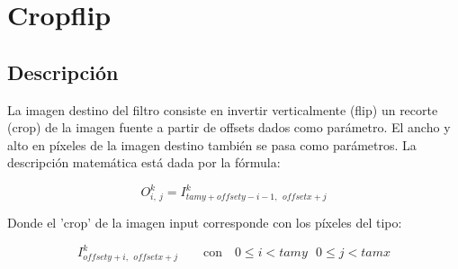 \section{Cropflip}

\subsection{Descripción}
La imagen destino del filtro consiste en invertir verticalmente (flip) un recorte (crop) de la imagen fuente a partir de offsets dados como parámetro. El ancho y alto en píxeles de la imagen destino también se pasa como parámetros.
La descripción matemática está dada por la fórmula:

$$ O_{i,\ j}^{k}=I_{tamy+offsety-i-1, \ \ offsetx+j}^{k} $$

Donde el 'crop' de la imagen input corresponde con los píxeles del tipo:

$$
I_{offsety+i, \ \ offsetx+j}^{k}
\qquad \text{con} \quad 0 \leq i < tamy \ \ \ 0 \leq j < tamx
$$


